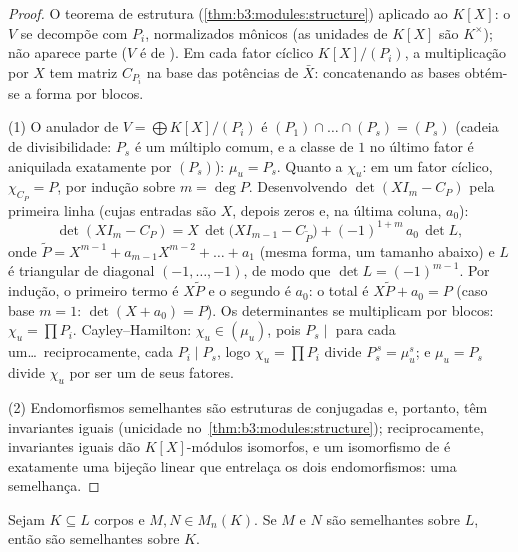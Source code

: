 \begin{proof}
O teorema de estrutura (\cref{thm:b3:modules:structure}) aplicado ao  $K[X]$: o
 $V$ se decompõe com  $P_i$,
normalizados mônicos (as unidades de $K[X]$ são $K^\times$); não aparece
parte  ($V$ é de ). Em cada fator cíclico $K[X]/(P_i)$, a
multiplicação por $X$ tem matriz $C_{P_i}$ na base das potências de
$\bar X$: concatenando as bases obtém-se a forma por blocos.

(1) O anulador de $V = \bigoplus K[X]/(P_i)$ é $(P_1)\cap
\dots\cap(P_s) = (P_s)$ (cadeia de divisibilidade: $P_s$ é
um múltiplo comum, e a classe de $1$ no último fator é aniquilada
exatamente por $(P_s)$): $\mu_u = P_s$. Quanto a $\chi_u$: em um fator
cíclico, $\chi_{C_P} = P$, por indução sobre $m = \deg P$. Desenvolvendo $\det(XI_m - C_P)$ pela
primeira linha (cujas entradas são $X$, depois zeros e, na última
coluna, $a_0$):
\[
\det(XI_m - C_P) = X\,\det\bigl(XI_{m-1} - C_{\tilde P}\bigr)
+ (-1)^{1+m}\,a_0\,\det L ,
\]
onde $\tilde P = X^{m-1} + a_{m-1}X^{m-2} + \dots + a_1$ (mesma forma, um tamanho abaixo) e $L$ é triangular de
diagonal $(-1, \dots, -1)$, de modo que $\det L = (-1)^{m-1}$. Por indução, o primeiro termo é
$X\tilde P$ e o segundo é $a_0$: o total é $X\tilde P + a_0 = P$ (caso base $m=1$:
$\det(X + a_0) = P$). Os determinantes se multiplicam por blocos: $\chi_u = \prod P_i$.
Cayley--Hamilton: $\chi_u \in (\mu_u)$, pois $P_s \mid$ para cada um\dots\ reciprocamente,
cada $P_i \mid P_s$, logo $\chi_u = \prod P_i$ divide $P_s^{\,s} = \mu_u^s$; e $\mu_u =
P_s$ divide $\chi_u$ por ser
um de seus fatores.

(2) Endomorfismos semelhantes são estruturas de  conjugadas e,
portanto, têm invariantes iguais (unicidade no~\cref{thm:b3:modules:structure});
reciprocamente, invariantes iguais dão $K[X]$-módulos isomorfos, e
um isomorfismo de  é exatamente uma bijeção linear que
entrelaça os dois endomorfismos: uma semelhança.
\end{proof}

\begin{corollary}
\label{cor:b3:modules:descent}
Sejam $K \subseteq L$ corpos e $M, N \in M_n(K)$. Se $M$ e $N$ são semelhantes sobre
$L$, então são semelhantes sobre $K$.
\end{corollary}

